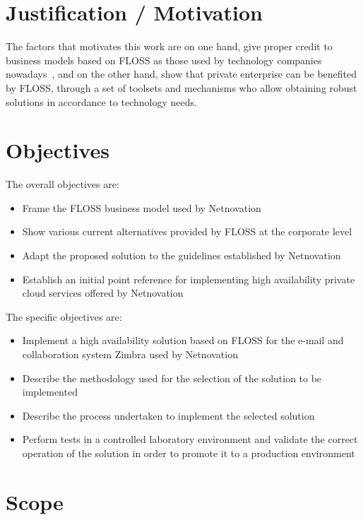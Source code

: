 \documentclass[a4paper, 12pt]{book}
\begin{document}
\section{Justification / Motivation}
\label{sec:justification}


The factors that motivates this work are on one hand, give proper credit to business models based on FLOSS as those used by technology companies nowadays~\cite{Daffara2}, and on the other hand, show that private enterprise can be benefited by FLOSS, through a set of toolsets and mechanisms who allow obtaining robust solutions in accordance to technology needs.

\section{Objectives}
\label{subsec:objectives}

The overall objectives are:

\begin{itemize}
	\item Frame the FLOSS business model used by Netnovation
	\item Show various current alternatives provided by FLOSS at the corporate level
	\item Adapt the proposed solution to the guidelines established by Netnovation
	\item Establish an initial point reference for implementing high availability private cloud services offered by Netnovation
\end{itemize}

\noindent The specific objectives are:

\begin{itemize}
	\item Implement a high availability solution based on FLOSS for the e-mail and collaboration system Zimbra used by Netnovation
	\item Describe the methodology used for the selection of the solution to be implemented
	\item Describe the process undertaken to implement the selected solution
	\item Perform tests in a controlled laboratory environment and validate the correct operation of the solution in order to promote it to a production environment
\end{itemize}



\section{Scope}
\label{sec:scope}
\end{document}
